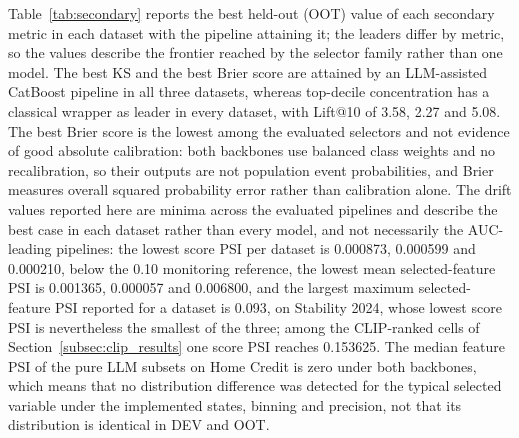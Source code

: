 \documentclass[final,5p,twocolumn]{elsarticle}
\begin{document}
Table~\ref{tab:secondary} reports the best held-out (OOT) value of each secondary metric in each dataset with the pipeline attaining it; the leaders differ by metric, so the values describe the frontier reached by the selector family rather than one model. The best KS and the best Brier score are attained by an LLM-assisted CatBoost pipeline in all three datasets, whereas top-decile concentration has a classical wrapper as leader in every dataset, with Lift@10 of 3.58, 2.27 and 5.08. The best Brier score is the lowest among the evaluated selectors and not evidence of good absolute calibration: both backbones use balanced class weights and no recalibration, so their outputs are not population event probabilities, and Brier measures overall squared probability error rather than calibration alone. The drift values reported here are minima across the evaluated pipelines and describe the best case in each dataset rather than every model, and not necessarily the AUC-leading pipelines: the lowest score PSI per dataset is 0.000873, 0.000599 and 0.000210, below the 0.10 monitoring reference, the lowest mean selected-feature PSI is 0.001365, 0.000057 and 0.006800, and the largest maximum selected-feature PSI reported for a dataset is 0.093, on Stability 2024, whose lowest score PSI is nevertheless the smallest of the three; among the CLIP-ranked cells of Section~\ref{subsec:clip_results} one score PSI reaches 0.153625. The median feature PSI of the pure LLM subsets on Home Credit is zero under both backbones, which means that no distribution difference was detected for the typical selected variable under the implemented states, binning and precision, not that its distribution is identical in DEV and OOT.
\end{document}
